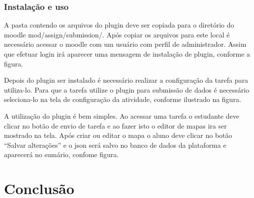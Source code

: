 \documentclass[
	12pt,				%
	openright,			%
	oneside,			%
	a4paper,			%
	english,			%
	french,				%
	spanish,			%
	brazil				%
	]{abntex2}
\begin{document}
\subsection{Instalação e uso}
A pasta contendo os arquivos do plugin deve ser copiada para o diretório do moodle mod/assign/submission/. Após copiar os arquivos para este local é necessário acessar o moodle com um usuário com perfil de administrador. Assim que efetuar login irá aparecer uma mensagem de instalação de plugin, conforme a figura.

Depois do plugin ser instalado é necessário realizar a configuração da tarefa para utiliza-lo. Para que a tarefa utilize o plugin para submissão de dados é necessário seleciona-lo na tela de configuração da atividade, conforme ilustrado na figura.

A utilização do plugin é bem simples. Ao acessar uma tarefa o estudante deve clicar no botão de envio de tarefa e ao fazer isto o editor de mapas ira ser mostrado na tela. Após criar ou editar o mapa o aluno deve clicar no botão “Salvar alterações” e o json será salvo no banco de dados da plataforma e aparecerá no sumário, confome figura.


\chapter{Conclusão}

\lipsum[31-33]

\postextual



%
%

\end{document}
